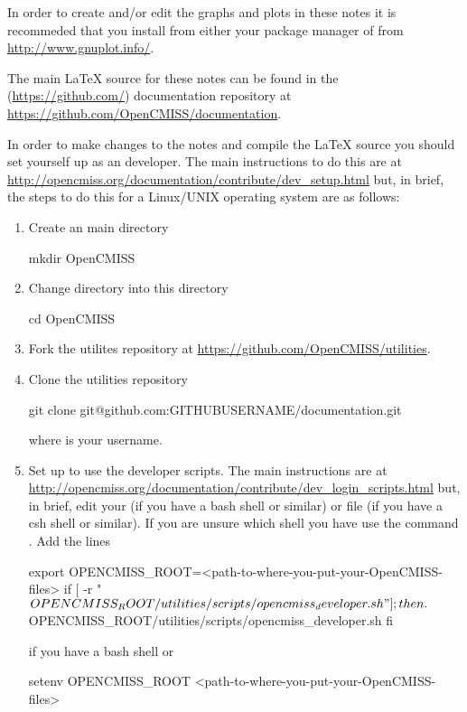 In order to create and/or edit the graphs and plots in these notes it
is recommeded that you install \Gnuplot from either your package
manager of from \url{http://www.gnuplot.info/}.

The main \LaTeX\xspace source for these notes can be found in the \OpenCMISS
\GitHub (\url{https://github.com/}) documentation repository at
\url{https://github.com/OpenCMISS/documentation}.

In order to make changes to the notes and compile the \LaTeX\xspace source
you should set yourself up as an \OpenCMISS developer. The main
instructions to do this are at
\url{http://opencmiss.org/documentation/contribute/dev_setup.html}
but, in brief, the steps to do this for a Linux/UNIX operating system
are as follows:
\begin{enumerate}
\item Create an \OpenCMISS main directory \ie
  \begin{code}
    mkdir OpenCMISS
  \end{code}
\item Change directory into this directory \ie
  \begin{code}
    cd OpenCMISS
  \end{code}
\item Fork the \OpenCMISS \GitHub utilites repository at \url{https://github.com/OpenCMISS/utilities}.
\item Clone the \OpenCMISS utilities repository \ie
  \begin{code}
    git clone git@github.com:GITHUBUSERNAME/documentation.git
  \end{code} where  is your \GitHub username.
\item Set up to use the developer scripts. The main instructions are
  at
  \url{http://opencmiss.org/documentation/contribute/dev_login_scripts.html}
  but, in brief, edit your  (if you have a bash shell or
  similar) or  file (if you have a csh shell or
  similar). If you are unsure which shell you have use the command
  . Add the lines
  \begin{code}
    export OPENCMISS_ROOT=<path-to-where-you-put-your-OpenCMISS-files>
    if [ -r "$OPENCMISS_ROOT/utilities/scripts/opencmiss_developer.sh" ]; then
      . $OPENCMISS_ROOT/utilities/scripts/opencmiss_developer.sh
    fi
  \end{code} if you have a bash shell or
  \begin{code}
    setenv OPENCMISS_ROOT <path-to-where-you-put-your-OpenCMISS-files>

\end{code}
\end{enumerate}
